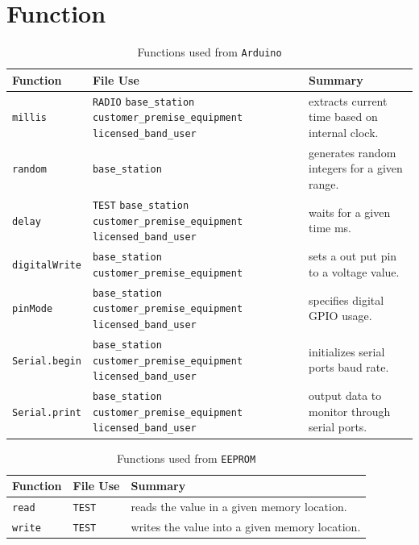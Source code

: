 \chapter{Function}
\begin{table}[ht]
\centering
    \begin{tabular}{ | l | p{5.5cm} | p{5cm} |}
    \hline
    Function  & File Use & Summary \\ \hline
    \texttt{millis} & \texttt{RADIO} \newline
    \texttt{base\_station} \texttt{customer\_premise\_equipment} \texttt{licensed\_band\_user} & extracts current time based on internal clock. \\ \hline
    \texttt{random} & \texttt{base\_station} & generates random integers for a given range. \\ \hline
    \texttt{delay} & \texttt{TEST} \newline
    \texttt{base\_station} \texttt{customer\_premise\_equipment} \texttt{licensed\_band\_user} & waits for a given time ms. \\\hline
    \texttt{digitalWrite} & \texttt{base\_station} \texttt{customer\_premise\_equipment} & sets a out put pin to a voltage value. \\\hline
    \texttt{pinMode} & \texttt{base\_station} \texttt{customer\_premise\_equipment} \texttt{licensed\_band\_user} & specifies digital GPIO usage.\\\hline
    \texttt{Serial.begin} & \texttt{base\_station} \texttt{customer\_premise\_equipment} \texttt{licensed\_band\_user} & initializes serial ports baud rate. \\\hline
    \texttt{Serial.print} & \texttt{base\_station} \texttt{customer\_premise\_equipment} \texttt{licensed\_band\_user} & output data to monitor through serial ports. \\\hline
    \hline
    \end{tabular}
\caption{Functions used from \texttt{Arduino}}
\label{tab:function}
\end{table}

\leavevmode\newline

\begin{table}[ht]
\centering
    \begin{tabular}{ | l | p{5.5cm} | p{6cm} |}
    \hline
    Function  & File Use & Summary \\ \hline
    \texttt{read} & \texttt{TEST} & reads the value in a given memory location. \\ \hline
    \texttt{write} & \texttt{TEST} & writes the value into a given memory location. \\ \hline
    \hline
    \end{tabular}
\caption{Functions used from \texttt{EEPROM}}
\label{tab:function2}
\end{table}


